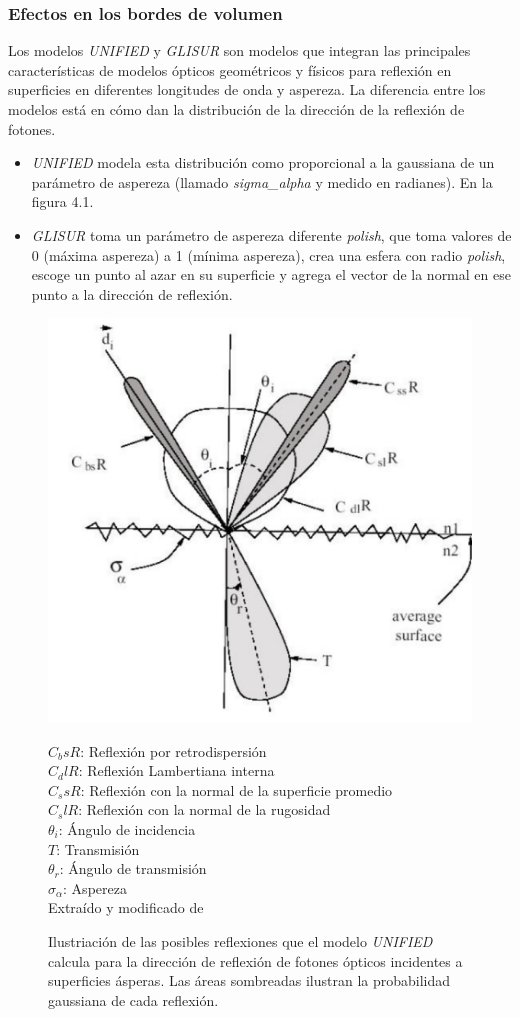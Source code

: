 \documentclass{book}
\begin{document}
\subsubsection{Efectos en los bordes de volumen}
Los modelos \textit{UNIFIED} y \textit{GLISUR} son modelos que integran las principales caracter\'isticas de modelos \'opticos geom\'etricos y f\'isicos para reflexi\'on en superficies en diferentes longitudes de onda y aspereza. La diferencia entre los modelos est\'a en c\'omo dan la distribuci\'on de la direcci\'on de la reflexi\'on de fotones.

\begin{itemize}
\item \textit{UNIFIED} modela esta distribuci\'on como proporcional a la gaussiana de un par\'ametro de aspereza (llamado \textit{sigma\_alpha} y medido en radianes). En la figura 4.1.
\item \textit{GLISUR}	toma un par\'ametro de aspereza diferente \textit{polish}, que toma valores de 0 (m\'axima aspereza) a 1 (m\'inima aspereza), crea una esfera con radio \textit{polish}, escoge un punto al azar en su superficie y agrega el vector de la normal en ese punto a la direcci\'on de reflexi\'on.
\end{itemize}

\begin{figure}[h] %
\begin{center}
 \includegraphics[width = 0.5\linewidth]{UNIFIED.png}
 
 $C_bsR$: Reflexi\'on por retrodispersi\'on\\
 $C_dlR$: Reflexi\'on Lambertiana interna\\
 $C_ssR$: Reflexi\'on con la normal de la superficie promedio\\
 $C_slR$: Reflexi\'on con la normal de la rugosidad\\
 $\theta_i$: \'Angulo de incidencia\\
 $T$: Transmisi\'on\\
 $\theta_r$: \'Angulo de transmisi\'on\\
 $\sigma_\alpha$: Aspereza\\
 Extra\'ido y modificado de \citep{GUMP}
\caption{Ilustriaci\'on de las posibles reflexiones que el modelo \textit{UNIFIED} calcula para la direcci\'on de reflexi\'on de fotones \'opticos incidentes a superficies \'asperas. Las \'areas sombreadas ilustran la probabilidad gaussiana de cada reflexi\'on.}
\end{center}
\end{figure}
\end{document}
